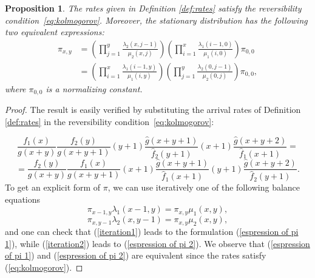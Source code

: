 \documentclass{article}
\newtheorem{proposition}{Proposition}
\theoremstyle{remark}
\newtheorem*{partial proof}{Partial proof of the Conjecture}
\begin{document}
\begin{proposition}
The rates given in Definition \ref{def:rates} satisfy the reversibility condition~\eqref{eq:kolmogorov}. Moreover, the stationary distribution has the following two equivalent expressions:
\begin{align}
\label{espression of pi 1}
\pi_{x,y} &=\left(\prod_{j=1}^{y}\frac{\lambda_{2}(x,j-1)}{\mu_{2}(x,j)}\right)\left(\prod_{i=1}^{x}\frac{\lambda_{1}(i-1,0)}{\mu_{1}(i,0)}\right)\pi_{0,0}\\
\label{espression of pi 2}
& = \left(\prod_{i=1}^{x}\frac{\lambda_{1}(i-1,y)}{\mu_{1}(i,y)}\right)\left(\prod_{j=1}^{y}\frac{\lambda_{2}(0,j-1)}{\mu_{2}(0,j)}\right)\pi_{0,0},
\end{align}
where $\pi_{0,0}$ is a normalizing constant.
\end{proposition}
\begin{proof}
The result is easily verified by substituting the arrival rates of Definition \ref{def:rates} in the reversibility condition~\eqref{eq:kolmogorov}:

$$
    \frac{f_1(x)}{g(x+y)} \frac{f_2(y)}{g(x+y+1)} (y+1) \frac{\hat{g}(x+y+1)}{\hat{f}_2(y+1)}(x+1)\frac{\hat{g}(x+y+2)}{\hat{f}_1(x+1)}=
$$
$$
=\frac{f_2(y)}{g(x+y)} \frac{f_1(x)}{g(x+y+1)} (x+1) \frac{\hat{g}(x+y+1)}{\hat{f}_1(x+1)}(y+1)\frac{\hat{g}(x+y+2)}{\hat{f}_2(y+1)}.
$$
To get an explicit form of $\pi$, we can use iteratively one of the following balance equations
\begin{equation}
    \label{iteration1}
    \pi_{x-1,y}\lambda_1(x-1,y)= \pi_{x,y}\mu_1(x,y),
\end{equation}
\begin{equation}
    \label{iteration2}
    \pi_{x,y-1}\lambda_2(x,y-1)= \pi_{x,y}\mu_2(x,y),
\end{equation}
and one can check that (\ref{iteration1}) leads to the formulation (\ref{espression of pi 1}), while (\ref{iteration2}) leads to (\ref{espression of pi 2}). We observe that (\ref{espression of pi 1}) and (\ref{espression of pi 2}) are equivalent since the rates satisfy (\ref{eq:kolmogorov}).
\end{proof}
\end{document}
